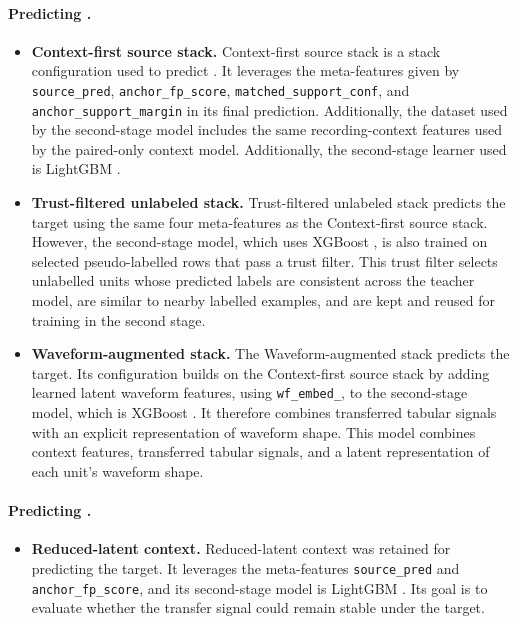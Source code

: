 \paragraph{Predicting \fpos{}.}
\begin{itemize}
    \item \textbf{Context-first source stack.} Context-first source stack is a stack configuration used to predict \fpos{}. It leverages the meta-features given by \texttt{source\_pred}, \texttt{anchor\_fp\_score}, \texttt{matched\_support\_conf}, and \texttt{anchor\_support\_margin} in its final prediction. Additionally, the dataset used by the second-stage model includes the same recording-context features used by the paired-only context model. Additionally, the second-stage learner used is LightGBM \parencite{Ke2017}.
    \item \textbf{Trust-filtered unlabeled stack.} Trust-filtered unlabeled stack predicts the \fpos{} target using the same four meta-features as the Context-first source stack. However, the second-stage model, which uses XGBoost \parencite{ChenGuestrin2016}, is also trained on selected pseudo-labelled rows that pass a trust filter. This trust filter selects unlabelled units whose predicted labels are consistent across the teacher model, are similar to nearby labelled examples, and are kept and reused for training in the second stage.
    \item \textbf{Waveform-augmented stack.} The Waveform-augmented stack predicts the \fpos{} target. Its configuration builds on the Context-first source stack by adding learned latent waveform features, using \texttt{wf\_embed\_\*}, to the second-stage model, which is XGBoost \parencite{ChenGuestrin2016}. It therefore combines transferred tabular signals with an explicit representation of waveform shape. This model combines context features, transferred tabular signals, and a latent representation of each unit's waveform shape.
\end{itemize}

\paragraph{Predicting \fmiss{}.}
\begin{itemize}
    \item \textbf{Reduced-latent context.} Reduced-latent context was retained for predicting the \fmiss{} target. It leverages the meta-features \texttt{source\_pred} and \texttt{anchor\_fp\_score}, and its second-stage model is LightGBM \parencite{Ke2017}. Its goal is to evaluate whether the transfer signal could remain stable under the \fmiss{} target.
\end{itemize}


